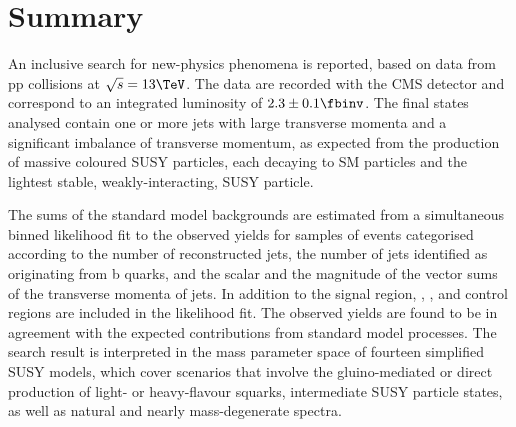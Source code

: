 \section{Summary}
\label{sec:summary}

An inclusive search for new-physics phenomena is reported, based on
data from pp collisions at $\sqrt{s} = 13\TeV$. The data are recorded
with the CMS detector and correspond to an integrated luminosity of
$2.3 \pm 0.1 \fbinv$. The final states analysed contain one or more
jets with large transverse momenta and a significant imbalance of
transverse momentum, as expected from the production of massive
coloured SUSY particles, each decaying to SM particles and the
lightest stable, weakly-interacting, SUSY particle.


The sums of the standard model backgrounds are estimated from a
simultaneous binned likelihood fit to the observed yields for samples
of events categorised according to the number of reconstructed jets,
the number of jets identified as originating from b quarks, and the
scalar and the magnitude of the vector sums of the transverse momenta
of jets. In addition to the signal region, \mj, \mmj, and \gj control
regions are included in the likelihood fit. The observed yields are
found to be in agreement with the expected contributions from standard
model processes.  The search result is interpreted in the mass
parameter space of fourteen simplified SUSY models,
which cover scenarios that involve the gluino-mediated or direct
production of light- or heavy-flavour squarks, intermediate SUSY
particle states, as well as natural and nearly mass-degenerate
spectra.

